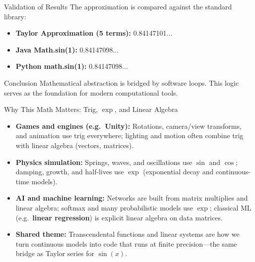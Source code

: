 \documentclass{beamer}
\begin{document}
\begin{frame}{Validation of Results}
  The approximation is compared against the standard library:
  \begin{itemize}
    \item \textbf{Taylor Approximation (5 terms):} 0.84147101...
    \item \textbf{Java Math.sin(1):} 0.84147098...
    \item \textbf{Python math.sin(1):} 0.84147098...
  \end{itemize}
  \vspace{0.5cm}
  \begin{alertblock}{Conclusion}
    Mathematical abstraction is bridged by software loops. This logic serves as the foundation for modern computational tools.
  \end{alertblock}
\end{frame}


\begin{frame}{Why This Math Matters: Trig, \texorpdfstring{$\exp$}{exp}, and Linear Algebra}
  \begin{itemize}
    \item \textbf{Games and engines (e.g.\ Unity):} Rotations, camera/view transforms, and animation use trig everywhere; lighting and motion often combine trig with linear algebra (vectors, matrices).
    \item \textbf{Physics simulation:} Springs, waves, and oscillations use $\sin$ and $\cos$; damping, growth, and half-lives use $\exp$ (exponential decay and continuous-time models).
    \item \textbf{AI and machine learning:} Networks are built from matrix multiplies and linear algebra; softmax and many probabilistic models use $\exp$; classical ML (e.g.\ \textbf{linear regression}) is explicit linear algebra on data matrices.
    \item \textbf{Shared theme:} Transcendental functions and linear systems are how we turn continuous models into code that runs at finite precision---the same bridge as Taylor series for $\sin(x)$.
  \end{itemize}
\end{frame}
\end{document}
